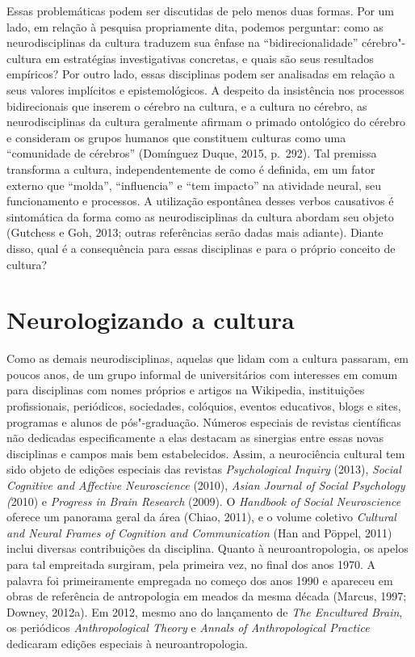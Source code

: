 Essas problemáticas podem ser discutidas de pelo menos duas formas. Por
um lado, em relação à pesquisa propriamente dita, podemos perguntar:
como as neurodisciplinas da cultura traduzem sua ênfase na
``bidirecionalidade'' cérebro"-cultura em estratégias investigativas
concretas, e quais são seus resultados empíricos? Por outro lado, essas
disciplinas podem ser analisadas em relação a seus valores implícitos e
epistemológicos. A despeito da insistência nos processos bidirecionais
que inserem o cérebro na cultura, e a cultura no cérebro, as
neurodisciplinas da cultura geralmente afirmam o primado ontológico do
cérebro e consideram os grupos humanos que constituem culturas como uma
``comunidade de cérebros'' (Domínguez Duque, 2015, p.~292). Tal premissa
transforma a cultura, independentemente de como é definida, em um fator
externo que ``molda'', ``influencia'' e ``tem impacto'' na atividade
neural, seu funcionamento e processos. A utilização espontânea desses
verbos causativos é sintomática da forma como as neurodisciplinas da
cultura abordam seu objeto (Gutchess e Goh, 2013; outras referências serão
dadas mais adiante). Diante disso, qual é a consequência para essas
disciplinas e para o próprio conceito de cultura?

\section{Neurologizando a cultura}

Como as demais neurodisciplinas, aquelas que lidam com a cultura
passaram, em poucos anos, de um grupo informal de universitários com
interesses em comum para disciplinas com nomes próprios e artigos na
Wikipedia, instituições profissionais, periódicos, sociedades,
colóquios, eventos educativos, blogs e sites, programas e
alunos de pós"-graduação. Números especiais de revistas científicas não
dedicadas especificamente a elas destacam as sinergias entre essas
novas disciplinas e campos mais bem estabelecidos. Assim, a neurociência
cultural tem sido objeto de edições especiais das revistas
\emph{Psychological Inquiry} (2013), \emph{Social Cognitive and
Affective Neuroscience} (2010), \emph{Asian Journal of Social Psychology
(}2010) e \emph{Progress in Brain Research} (2009). O \emph{Handbook of
Social Neuroscience} oferece um panorama geral da área (Chiao, 2011), e
o volume coletivo \emph{Cultural and Neural Frames of Cognition and
Communication} (Han and Pöppel, 2011) inclui diversas contribuições da
disciplina. Quanto à neuroantropologia, os apelos para tal empreitada
surgiram, pela primeira vez, no final dos anos 1970. A palavra foi
primeiramente empregada no começo dos anos 1990 e apareceu em obras de
referência de antropologia em meados da mesma década (Marcus, 1997; Downey,
2012a). Em 2012, mesmo ano do lançamento de \emph{The Encultured Brain},
os periódicos \emph{Anthropological Theory} e \emph{Annals of
Anthropological Practice} dedicaram edições especiais à
neuroantropologia.

